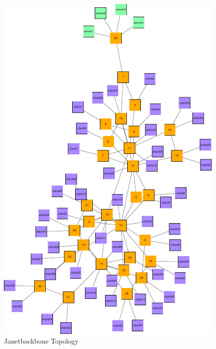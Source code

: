 \begin{figure}[htbp]
    \centering
    \includegraphics[width=\linewidth, height=\textheight]{Networks/Janetbackbone_final.pdf}
    \caption{Janetbackbone Topology}
    \label{fig:Janetbackbone}
\end{figure}

